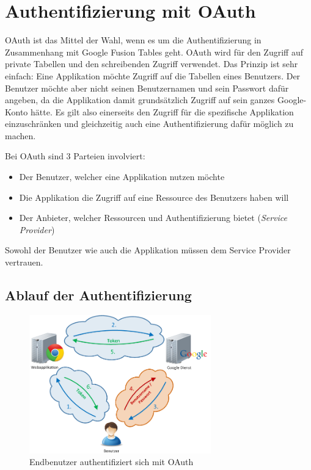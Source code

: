 \section{Authentifizierung mit OAuth}
\label{oauth}

\gls{OAuth} ist das Mittel der Wahl, wenn es um die Authentifizierung in Zusammenhang mit Google Fusion Tables geht. \gls{OAuth} wird für den Zugriff auf private Tabellen und den schreibenden Zugriff verwendet.
Das Prinzip ist sehr einfach: Eine Applikation möchte Zugriff auf die Tabellen eines Benutzers. Der Benutzer möchte aber nicht seinen Benutzernamen und sein Passwort dafür angeben, da die Applikation damit grundsätzlich Zugriff auf sein ganzes Google-Konto hätte. Es gilt also einerseits den Zugriff für die spezifische Applikation einzuschränken und gleichzeitig auch eine Authentifizierung dafür möglich zu machen.

Bei \gls{OAuth} sind 3 Parteien involviert:
\begin{itemize}
\item Der Benutzer, welcher eine Applikation nutzen möchte
\item Die Applikation die Zugriff auf eine Ressource des Benutzers haben will
\item Der Anbieter, welcher Ressourcen und Authentifizierung bietet (\emph{Service Provider})
\end{itemize}

Sowohl der Benutzer wie auch die Applikation müssen dem Service Provider vertrauen.

\subsection{Ablauf der Authentifizierung}
\label{oauth-authentication}

\begin{figure}[!ht]
	\centering
	\includegraphics[width=0.7\textwidth]{images/oauth/oauth-user}
	\caption{Endbenutzer authentifiziert sich mit \gls{OAuth}}
	\label{oauth-user}
\end{figure}

